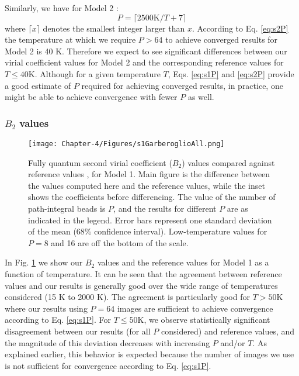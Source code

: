             Similarly, we have for Model 2 \cite{Garberoglio2012}:
            \begin{equation}
            \label{eq:s2P}
                P = \lceil 2500 \textrm{K}/T + 7 \rceil
            \end{equation}
            where $\lceil x \rceil$ denotes the smallest integer larger than $x$.
According to Eq. \eqref{eq:s2P} the temperature at which we require $P > 64$ to achieve converged results for Model 2 is 40 K. Therefore we expect to see significant differences between our virial coefficient values for Model 2 and the corresponding reference values for $T \le 40 $K. Although for a given temperature $T$, Eqs. \eqref{eq:s1P} and \eqref{eq:s2P} provide a good estimate of $P$ required for achieving converged results, in practice, one might be able to achieve convergence with fewer $P$ as well.

            \subsubsection{$B_2$ values}
                \begin{figure}[!htbp]
                    \centering
                    \texttt{[image: Chapter-4/Figures/s1GarberoglioAll.png]}
                    \caption{Fully quantum second virial coefficient ($B_2$) values compared against reference values \cite{Garberoglio2014}, for Model 1. Main figure is the difference between the values computed here and the reference values, while the inset shows the coefficients before differencing. The value of the number of path-integral beads is $P$, and the results for different $P$ are as indicated in the legend. Error bars represent one standard deviation of the mean (68\% confidence interval). Low-temperature values for $P = 8$ and 16 are off the bottom of the scale.}
                    \label{fig:r0}
                \end{figure}
                In Fig. \ref{fig:r0} we show our $B_2$ values and the reference values for Model 1 as a function of temperature. It can be seen that the agreement between reference values and our results is generally good over the wide range of temperatures considered (15 K to 2000 K). The agreement is particularly good for $T > 50 $K where our results using $P = 64$ images are sufficient to achieve convergence according to Eq. \eqref{eq:s1P}. For $T \le 50 $K, we observe statistically significant disagreement between our results (for all $P$ considered) and reference values, and the magnitude of this deviation decreases with increasing $P$ and/or $T$. As explained earlier, this behavior is expected because the number of images we use is not sufficient for convergence according to Eq. \eqref{eq:s1P}.

